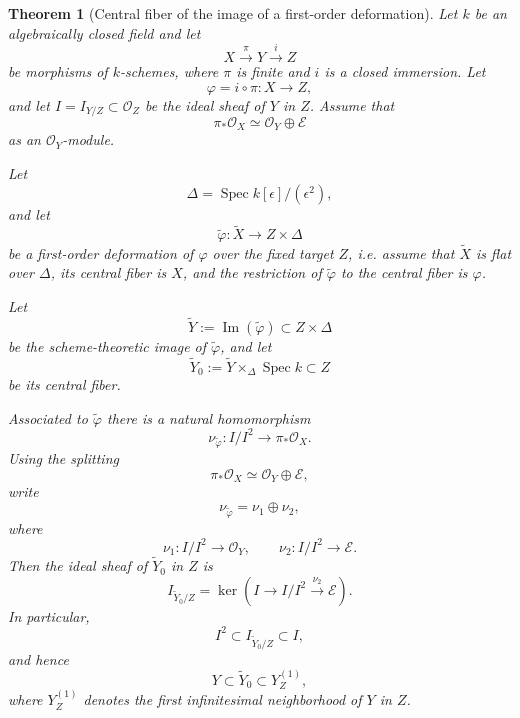 \documentclass[11pt,twoside]{amsart}
\theoremstyle{plain}
\numberwithin{equation}{section}
\newtheorem{theorem}{Theorem}[section]
\theoremstyle{definition}
\begin{document}
\begin{theorem}[Central fiber of the image of a first-order deformation]
\label{thm:central-fiber-image-singular-source}
Let \(k\) be an algebraically closed field and let
\[
    X \xrightarrow{\pi} Y \xrightarrow{i} Z
\]
be morphisms of \(k\)-schemes, where \(\pi\) is finite and \(i\) is a closed immersion.
Let
\[
    \varphi=i\circ \pi:X\to Z,
\]
and let \(I=I_{Y/Z}\subset \mathcal O_Z\) be the ideal sheaf of \(Y\) in \(Z\).
Assume that
\[
    \pi_*\mathcal O_X\simeq \mathcal O_Y\oplus \mathcal E
\]
as an \(\mathcal O_Y\)-module.

Let
\[
    \Delta=\operatorname{Spec} k[\epsilon]/(\epsilon^2),
\]
and let
\[
    \widetilde\varphi:\widetilde X\longrightarrow Z\times \Delta
\]
be a first-order deformation of \(\varphi\) over the fixed target \(Z\), i.e. assume that
\(\widetilde X\) is flat over \(\Delta\), its central fiber is \(X\), and the restriction of
\(\widetilde\varphi\) to the central fiber is \(\varphi\).

Let
\[
    \widetilde Y:=\operatorname{Im}(\widetilde\varphi)\subset Z\times\Delta
\]
be the scheme-theoretic image of \(\widetilde\varphi\), and let
\[
    \widetilde Y_0:=\widetilde Y\times_{\Delta}\operatorname{Spec}k
    \subset Z
\]
be its central fiber.

Associated to \(\widetilde\varphi\) there is a natural homomorphism
\[
    \nu_{\widetilde\varphi}: I/I^2\longrightarrow \pi_*\mathcal O_X.
\]
Using the splitting
\[
    \pi_*\mathcal O_X\simeq \mathcal O_Y\oplus \mathcal E,
\]
write
\[
    \nu_{\widetilde\varphi}
    =
    \nu_1\oplus \nu_2,
\]
where
\[
    \nu_1:I/I^2\to \mathcal O_Y,
    \qquad
    \nu_2:I/I^2\to \mathcal E.
\]
Then the ideal sheaf of \(\widetilde Y_0\) in \(Z\) is
\[
    I_{\widetilde Y_0/Z}
    =
    \ker\left(
        I
        \longrightarrow
        I/I^2
        \xrightarrow{\nu_2}
        \mathcal E
    \right).
\]
In particular,
\[
    I^2\subset I_{\widetilde Y_0/Z}\subset I,
\]
and hence
\[
    Y\subset \widetilde Y_0\subset Y^{(1)}_Z,
\]
where \(Y^{(1)}_Z\) denotes the first infinitesimal neighborhood of \(Y\) in \(Z\).
\end{theorem}
\end{document}
